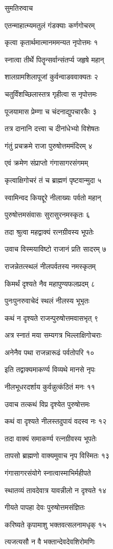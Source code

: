 
सुमतिरुवाच

एतन्माहात्म्यमतुलं गंडक्याः कर्णगोचरम्

कृत्वा कृतार्थमात्मानममन्यत नृपोत्तमः १

स्नात्वा तीर्थे पितॄन्सर्वान्संतर्प्य जहृषे महान्

शालग्रामशिलापूजां कुर्वन्वाडववाक्यतः २

चतुर्विंशच्छिलास्तत्र गृहीत्वा स नृपोत्तमः

पूजयामास प्रेम्णा च चंदनाद्युपचारकैः ३

तत्र दानानि दत्त्वा च दीनांधेभ्यो विशेषतः

गंतुं प्रचक्रमे राजा पुरुषोत्तममंदिरम् ४

एवं क्रमेण संप्राप्तो गंगासागरसंगमम्

कृत्वाक्षिगोचरं तं च ब्राह्मणं पृष्टवान्मुदा ५

स्वामिन्वद कियद्दूरे नीलाख्यः पर्वतो महान्

पुरुषोत्तमसंवासः सुरासुरनमस्कृतः ६

तदा श्रुत्वा महद्वाक्यं रत्नग्रीवस्य भूपतेः

उवाच विस्मयाविष्टो राजानं प्रति सादरम् ७

राजन्नेतत्स्थलं नीलपर्वतस्य नमस्कृतम्

किमर्थं दृश्यते नैव महापुण्यफलप्रदम् ८

पुनःपुनरुवाचेदं स्थलं नीलस्य भूभृतः

कथं न दृश्यते राजन्पुरुषोत्तमवासभृत् ९

अत्र स्नातं मया सम्यगत्र भिल्लाक्षिगोचराः

अनेनैव पथा राजन्नारूढं पर्वतोपरि १०

इति तद्वाक्यमाकर्ण्य विव्यथे मानसे नृपः

नीलभूधरदर्शाय कुर्वन्नुत्कंठितं मनः ११

उवाच तत्कथं विप्र दृश्येत पुरुषोत्तमः

कथं वा दृश्यते नीलस्तदुपायं वदस्व नः १२

तदा वाक्यं समाकर्ण्य रत्नग्रीवस्य भूपतेः

तापसो ब्राह्मणो वाक्यमुवाच नृप विस्मितः १३

गंगासागरसंयोगे स्नात्वास्माभिर्महीपते

स्थातव्यं तावदेवात्र यावन्नीलो न दृश्यते १४

गीयते पापहा देवः पुरुषोत्तमसंज्ञितः

करिष्यते कृपामाशु भक्तवत्सलनामधृक् १५

त्यजत्यसौ न वै भक्तान्देवदेवशिरोमणिः

